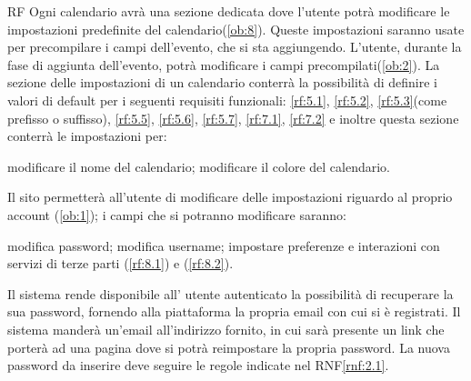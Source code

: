 \begin{listaPersonale}{RF}
	 Ogni calendario avrà una sezione dedicata dove l'utente potrà modificare le impostazioni predefinite del calendario(\ref{ob:8}). Queste impostazioni saranno usate per precompilare i campi dell'evento, che si sta aggiungendo. L'utente, durante la fase di aggiunta dell'evento, potrà modificare i campi precompilati(\ref{ob:2}). La sezione delle impostazioni di un calendario conterrà la possibilità di definire i valori di default per i seguenti requisiti funzionali: \ref{rf:5.1}, \ref{rf:5.2}, \ref{rf:5.3}(come prefisso o suffisso), \ref{rf:5.5}, \ref{rf:5.6}, \ref{rf:5.7}, \ref{rf:7.1}, \ref{rf:7.2} e inoltre questa sezione conterrà le impostazioni per:
	\begin{listaPersonale2}{}
		 modificare il nome del calendario;
		 modificare il colore del calendario.
	\end{listaPersonale2}

	 Il sito permetterà all'utente di modificare delle impostazioni riguardo al proprio account (\ref{ob:1}); i campi che si potranno modificare saranno:
	\begin{listaPersonale2}{}
		 modifica password;
		 modifica username;
		 impostare preferenze e interazioni con servizi di terze parti (\ref{rf:8.1}) e (\ref{rf:8.2}).
	\end{listaPersonale2}

	Il sistema rende disponibile all’ utente autenticato la possibilità di recuperare la sua password, fornendo alla piattaforma la propria email con cui si è registrati. Il sistema manderà un’email all'indirizzo fornito, in cui sarà presente un link che porterà ad una pagina dove si potrà reimpostare la propria password. La nuova password da inserire deve seguire le regole indicate nel RNF\ref{rnf:2.1}. %
\end{listaPersonale}